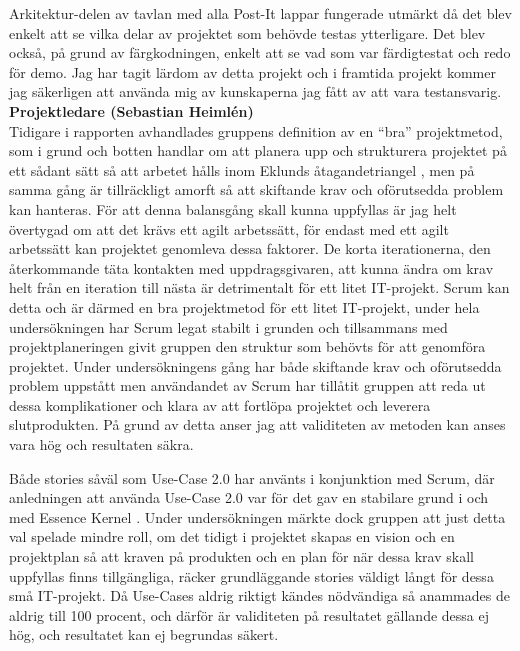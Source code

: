 \documentclass[conference,a4paper]{IEEEtran}
\begin{document}
Arkitektur-delen av tavlan med alla Post-It lappar fungerade utmärkt då det blev enkelt att se vilka delar av projektet som behövde testas ytterligare. Det blev också, på grund av färgkodningen, enkelt att se vad som var färdigtestat och redo för demo.   
Jag har tagit lärdom av detta projekt och i framtida projekt kommer jag säkerligen att använda mig av kunskaperna jag fått av att vara testansvarig. 
\\

\noindent \textbf{Projektledare (Sebastian Heimlén)}\\
Tidigare i rapporten avhandlades gruppens definition av en ``bra'' projektmetod, som i grund och botten handlar om att planera upp och strukturera projektet på ett sådant sätt så att arbetet hålls inom Eklunds åtagandetriangel \cite[s. 128-129]{Eklund14}, men på samma gång är tillräckligt amorft så att skiftande krav och oförutsedda problem kan hanteras. För att denna balansgång skall kunna uppfyllas är jag helt övertygad om att det krävs ett agilt arbetssätt, för endast med ett agilt arbetssätt kan projektet genomleva dessa faktorer. De korta iterationerna, den återkommande täta kontakten med uppdragsgivaren, att kunna ändra om krav helt från en iteration till nästa är detrimentalt för ett litet IT-projekt. Scrum kan detta och är därmed en bra projektmetod för ett litet IT-projekt, under hela undersökningen har Scrum legat stabilt i grunden och tillsammans med projektplaneringen givit gruppen den struktur som behövts för att genomföra projektet. Under undersökningens gång har både skiftande krav och oförutsedda problem uppstått men användandet av Scrum har tillåtit gruppen att reda ut dessa komplikationer och klara av att fortlöpa projektet och leverera slutprodukten. På grund av detta anser jag att validiteten av metoden kan anses vara hög och resultaten säkra.

Både stories såväl som Use-Case 2.0 har använts i konjunktion med Scrum, där anledningen att använda Use-Case 2.0 var för det gav en stabilare grund i och med Essence Kernel \cite{Jacobson11}. Under undersökningen märkte dock gruppen att just detta val spelade mindre roll, om det tidigt i projektet skapas en vision och en projektplan så att kraven på produkten och en plan för när dessa krav skall uppfyllas finns tillgängliga, räcker grundläggande stories väldigt långt för dessa små IT-projekt. Då Use-Cases aldrig riktigt kändes nödvändiga så anammades de aldrig till 100 procent, och därför är validiteten på resultatet gällande dessa ej hög, och resultatet kan ej begrundas säkert.
\end{document}
